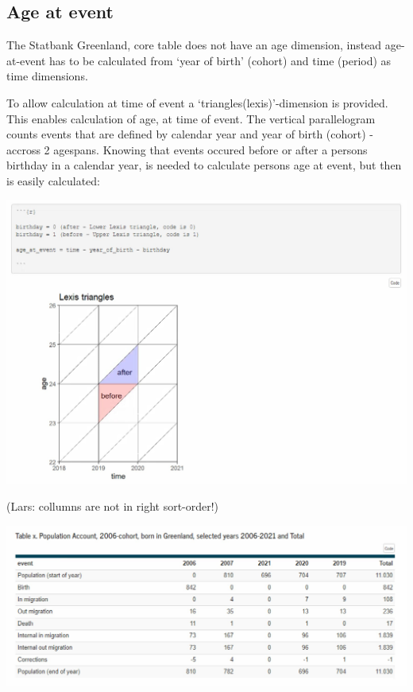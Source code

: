 \documentclass[USenglish]{article}
\begin{document}
\subsection{Age at event} 

The Statbank Greenland, core table does not have an age dimension, instead age-at-event has to be calculated from ‘year of birth’ (cohort) and time (period) as time dimensions.

To allow calculation at time of event a ‘triangles(lexis)’-dimension is provided. This enables calculation of age, at time of event. The vertical parallelogram counts events that are defined by calendar year and year of birth (cohort) - accross 2 agespans. Knowing that events occured before or after a persons birthday in a calendar year, is needed to calculate persons age at event, but then is easily calculated:

\includegraphics[scale=0.25]{images/PopulationAccountLexis}


(Lars: collumns are not in right sort-order!)

\includegraphics[scale=0.22]{images/PopulationAccountTabX}
\end{document}
